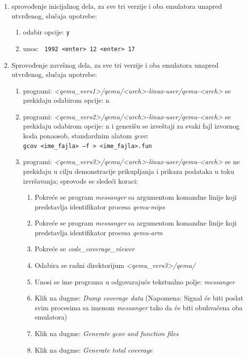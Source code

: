 \documentclass[12pt,oneside]{memoir}
\newcommand{\kod}[1]{\texttt{#1}}
\newcommand{\strano}[1]{\textit{#1}}
\begin{document}
\begin{enumerate}
\item sprovođenje inicijalnog dela, za sve tri verzije i oba emulatora unapred utvrđenog, slučaja upotrebe:
\begin{enumerate}
\item odabir opcije: \kod{y}
\item unos: \kod{ 1992 <enter> 12 <enter> 17}
\end{enumerate}

\item Sprovođenje završnog dela, za sve tri verzije i oba emulatora unapred utvrđenog, slučaja upotrebe:
\begin{enumerate}
\item programi: \strano{<qemu\_vers1>/qemu/<arch>-linux-user/qemu-<arch>} se prekidaju odabirom opcije: n
\item programi: \strano{<qemu\_vers2>/qemu/<arch>-linux-user/qemu-<arch>} se prekidaju odabirom opcije: n i generišu se izveštaji za svaki fajl izvornog koda ponaosob, standardnim alatom \strano{gcov}: \\
\kod{gcov <ime\_fajla> –f  > <ime\_fajla>.fun}
\item programi: \strano{<qemu\_vers3>/qemu/<arch>-linux-user/qemu-<arch>} se ne prekidaju u cilju demonstracije prikupljanja i prikaza podataka u toku izvršavanja; sprovode se sledeći koraci:
\begin{enumerate}
\item Pokreće se program \strano{messanger} sa argumentom komandne linije koji predstavlja identifikator procesa \strano{qemu-mips}
\item Pokreće se program \strano{messanger} sa argumentom komandne linije koji predstavlja identifikator procesa \strano{qemu-arm}
\item Pokreće se \strano{code\_coverage\_viewer}
\item Odabira se radni direktorijum \strano{<qemu\_vers3>/qemu/}
\item Unosi se ime programa u odgovarajuće tekstualno polje: \strano{messanger}
\item  Klik na dugme: \strano{Dump coverage data} (Napomena: Signal će biti poslat svim procesima sa imenom \strano{messanger} tako da će biti obuhvaćena oba emulatora)
\item Klik na dugme: \strano{Generate gcov and function files}
\item Klik na dugme: \strano{Generate total coverage}
\end{enumerate}
\end{enumerate}


\end{enumerate}
\end{document}
